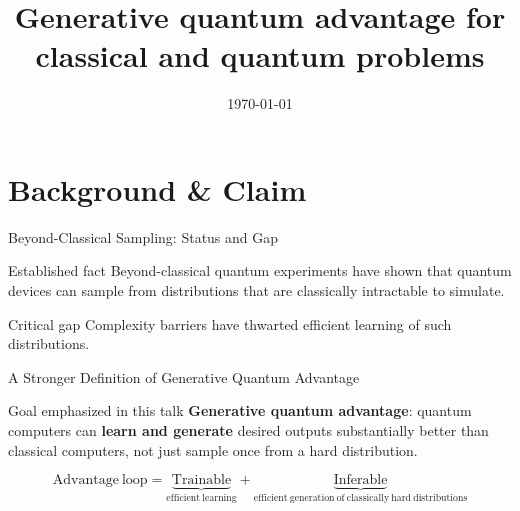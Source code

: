 \documentclass[aspectratio=169]{beamer}
\title{Generative quantum advantage for classical and quantum problems}
\author{}
\institute{Quantum Machine Learning}
\date{\today}
\begin{document}
\begin{frame}
  \maketitle
\end{frame}


\section{Background \& Claim}

\begin{frame}{Beyond-Classical Sampling: Status and Gap}
  \begin{block}{Established fact}
    Beyond-classical quantum experiments have shown that quantum devices can sample from distributions that are classically intractable to simulate.
  \end{block}
\vspace{0.3em}
  \begin{alertblock}{Critical gap}
    Complexity barriers have thwarted efficient learning of such distributions.
  \end{alertblock}

\end{frame}

\begin{frame}{A Stronger Definition of Generative Quantum Advantage}
  \begin{block}{Goal emphasized in this talk}
    {\bfseries Generative quantum advantage}: quantum computers can \textbf{learn and generate} desired outputs substantially better than classical computers, not just sample once from a hard distribution.
  \end{block}

  \[
      \mathrm{Advantage\ loop} = \underbrace{\mathrm{Trainable}}_{\mathrm{efficient\ learning}} + \underbrace{\mathrm{Inferable}}_{\mathrm{efficient\ generation\ of\ classically\ hard\ distributions}}
  \]
\end{frame}
\end{document}
